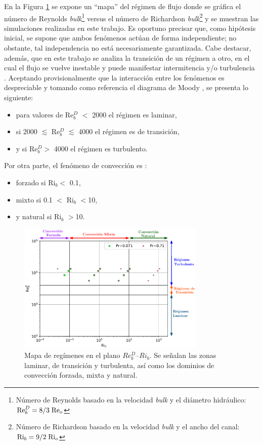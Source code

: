 En la Figura \ref{fig:map_flow_regime} se expone un ``mapa'' del régimen de flujo donde se gráfica el número de Reynolds \textit{bulk}\footnote{Número de Reynolds basado en la velocidad \textit{bulk} y el diámetro hidráulico: $\text{Re}^D_b = 8/3 \hspace*{1mm} \text{Re}_o$} versus el número de Richardson \textit{bulk}\footnote{Número de Richardson basado en la velocidad \textit{bulk} y el ancho del canal: $\text{Ri}_b = 9/2 \hspace*{1mm} \text{Ri}_o$} y se muestran las simulaciones realizadas en este trabajo. Es oportuno precisar que, como hipótesis inicial, se supone que ambos fenómenos actúan de forma independiente; no obstante, tal independencia no está necesariamente garantizada. Cabe destacar, además, que en este trabajo se analiza la transición de un régimen a otro, en el cual el flujo se vuelve inestable y puede manifestar intermitencia y/o turbulencia \cite{chen2003direct}. Aceptando provisionalmente que la interacción entre los fenómenos es despreciable y tomando como referencia el diagrama de Moody \cite{white}, se presenta lo siguiente:

\begin{itemize}
	\item para valores de Re$^D_b$ $<$ 2000 el régimen es laminar,
	\item si 2000 $\lesssim$ Re$^D_b$ $\lesssim$ 4000 el régimen es de transición,
	\item y si Re$^D_b>$ 4000 el régimen es turbulento.
\end{itemize}
Por otra parte, el fenómeno de convección es \cite{incropera,cengelheat}:

\begin{itemize}
	\item forzado si Ri$_b<$ 0.1,
	\item mixto si 0.1 $<$ Ri$_b$ $<$10,
	\item y natural si Ri$_b$ $>$10.
\end{itemize}

\begin{figure}[H]
  \centering
    \includegraphics[width=0.8\textwidth]{figures/cap5/map.eps}
  \caption{Mapa de regímenes en el plano $Re^D_b$–$Ri_b$. Se señalan las zonas laminar, de transición y turbulenta, así como los dominios de convección forzada, mixta y natural.}
  \label{fig:map_flow_regime}
\end{figure}

